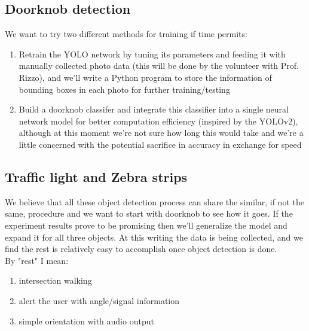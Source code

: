 \documentclass{article}
\begin{document}
\subsection{Doorknob detection}
We want to try two different methods for training if time permits:

\begin{enumerate}
	\item Retrain the YOLO network by tuning its parameters and feeding it with manually collected photo data (this will be done by the volunteer with Prof. Rizzo), and we'll write a Python program to store the information of bounding boxes in each photo for further training/testing
	\item Build a doorknob classifer and integrate this classifier into a single neural network model for better computation efficiency (inspired by the YOLOv2), although at this moment we're not sure how long this would take and we're a little concerned with the potential sacrifice in accuracy in exchange for speed
\end{enumerate}


\subsection{Traffic light and Zebra strips}
We believe that all these object detection process can share the similar, if not the same, procedure and we want to start with doorknob to see how it goes. If the experiment results prove to be promising then we'll generalize the model and expand it for all three objects. At this writing the data is being collected, and we find the rest is relatively easy to accomplish once object detection is done.\\
By "rest" I mean:
\begin{enumerate}
	\item intersection walking
	\item alert the user with angle/signal information
	\item simple orientation with audio output
\end{enumerate}



\end{document}
